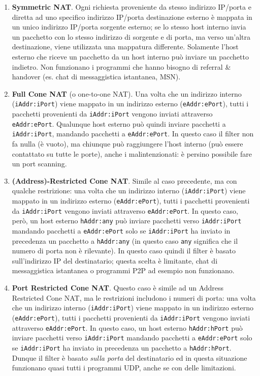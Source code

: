 \begin{enumerate}
	\item \textbf{Symmetric NAT}. Ogni richiesta proveniente da stesso indirizzo IP/porta e diretta ad uno specifico indirizzo IP/porta destinazione esterno è mappata in un unico indirizzo IP/porta sorgente esterno; se lo stesso host interno invia un pacchetto con lo stesso indirizzo di sorgente e di porta, ma verso un'altra destinazione, viene utilizzata una mappatura differente. Solamente l'host esterno che riceve un pacchetto da un host interno può inviare un pacchetto indietro. Non funzionano i programmi che hanno bisogno di referral \& handover (es. chat di messaggistica istantanea, MSN).
	
	\item \textbf{Full Cone NAT} (o one-to-one NAT). Una volta che un indirizzo interno (\texttt{iAddr:iPort}) viene mappato in un indirizzo esterno (\texttt{eAddr:ePort}), tutti i pacchetti provenienti da \texttt{iAddr:iPort} vengono inviati attraverso \texttt{eAddr:ePort}. Qualunque host esterno può quindi inviare pacchetti a \texttt{iAddr:iPort}, mandando pacchetti a \texttt{eAddr:ePort}. In questo caso il filter non fa nulla (è vuoto), ma chiunque può raggiungere l'host interno (può essere contattato su tutte le porte), anche i malintenzionati: è persino possibile fare un port scanning.
	
	\item \textbf{(Address)-Restricted Cone NAT}. Simile al caso precedente, ma con qualche restrizione: una volta che un indirizzo interno (\texttt{iAddr:iPort}) viene mappato in un indirizzo esterno (\texttt{eAddr:ePort}), tutti i pacchetti provenienti da \texttt{iAddr:iPort} vengono inviati attraverso \texttt{eAddr:ePort}. In questo caso, però, un host esterno \texttt{hAddr:any} può inviare pacchetti verso \texttt{iAddr:iPort} mandando pacchetti a \texttt{eAddr:ePort} solo se \texttt{iAddr:iPort} ha inviato in precedenza un pacchetto a \texttt{hAddr:any} (in questo caso \texttt{any} significa che il numero di porta non è rilevante). In questo caso quindi il filter è basato sull'indirizzo IP del destinatario; questa scelta è limitante, chat di messaggistica istantanea o programmi P2P ad esempio non funzionano.
	
	\item \textbf{Port Restricted Cone NAT}. Questo caso è simile ad un Address Restricted Cone NAT, ma le restrizioni includono i numeri di porta: una volta che un indirizzo interno (\texttt{iAddr:iPort}) viene mappato in un indirizzo esterno (\texttt{eAddr:ePort}), tutti i pacchetti provenienti da \texttt{iAddr:iPort} vengono inviati attraverso \texttt{eAddr:ePort}. In questo caso, un host esterno \texttt{hAddr:hPort} può inviare pacchetti verso \texttt{iAddr:iPort} mandando pacchetti a \texttt{eAddr:ePort} solo se \texttt{iAddr:iPort} ha inviato in precedenza un pacchetto a \texttt{hAddr:hPort}. Dunque il filter è basato \textit{sulla porta} del destinatario ed in questa situazione funzionano quasi tutti i programmi UDP, anche se con delle limitazioni.
\end{enumerate}
